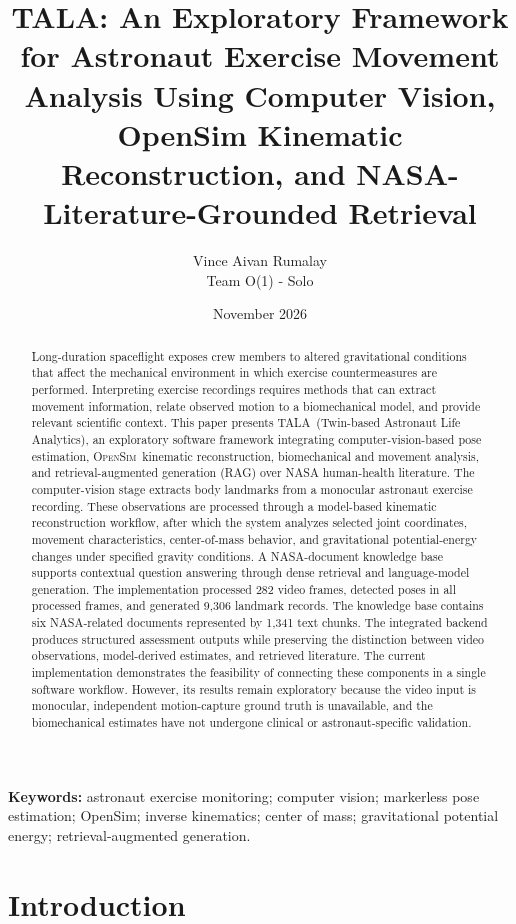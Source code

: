 \documentclass[11pt,a4paper]{article}
\title{\textbf{TALA: An Exploratory Framework for Astronaut Exercise Movement Analysis Using Computer Vision, OpenSim Kinematic Reconstruction, and NASA-Literature-Grounded Retrieval}}
\author{{Vince Aivan Rumalay}\\{Team O(1) - Solo}}
\date{November 2026}
\newcommand{\TALA}{\textsc{TALA}}
\newcommand{\OpenSim}{\textsc{OpenSim}}
\begin{document}
\maketitle

\begin{abstract}
Long-duration spaceflight exposes crew members to altered gravitational conditions that affect the mechanical environment in which exercise countermeasures are performed. Interpreting exercise recordings requires methods that can extract movement information, relate observed motion to a biomechanical model, and provide relevant scientific context. This paper presents \TALA\ (Twin-based Astronaut Life Analytics), an exploratory software framework integrating computer-vision-based pose estimation, \OpenSim\ kinematic reconstruction, biomechanical and movement analysis, and retrieval-augmented generation (RAG) over NASA human-health literature. The computer-vision stage extracts body landmarks from a monocular astronaut exercise recording. These observations are processed through a model-based kinematic reconstruction workflow, after which the system analyzes selected joint coordinates, movement characteristics, center-of-mass behavior, and gravitational potential-energy changes under specified gravity conditions. A NASA-document knowledge base supports contextual question answering through dense retrieval and language-model generation. The implementation processed 282 video frames, detected poses in all processed frames, and generated 9,306 landmark records. The knowledge base contains six NASA-related documents represented by 1,341 text chunks. The integrated backend produces structured assessment outputs while preserving the distinction between video observations, model-derived estimates, and retrieved literature. The current implementation demonstrates the feasibility of connecting these components in a single software workflow. However, its results remain exploratory because the video input is monocular, independent motion-capture ground truth is unavailable, and the biomechanical estimates have not undergone clinical or astronaut-specific validation.
\end{abstract}

\noindent\textbf{Keywords:} astronaut exercise monitoring; computer vision; markerless pose estimation; OpenSim; inverse kinematics; center of mass; gravitational potential energy; retrieval-augmented generation.

\section{Introduction}
\end{document}
